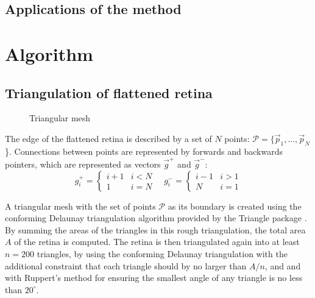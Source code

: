 \documentclass{article}
\begin{document}
\subsection{Applications of the method}
\label{fold-sphere:sec:applications-method}


\section{Algorithm}
\label{fold-retina:sec:method}



\subsection{Triangulation of flattened retina}
\label{fold-sphere:sec:triang-flatt-retina}

\begin{figure}[tp]
  \centering
  \caption{Triangular mesh}
  \label{fold-sphere:fig:mesh}
\end{figure}

The edge of the flattened retina is described by a set of $N$ points:
$\mathcal{P} = \{\vec{p}_1,\dots,\vec{p}_N$\}. Connections between
points are represented by forwards and backwards pointers, which are
represented as vectors $\vec{g}^+$ and $\vec{g}^-$:
\begin{displaymath}
  g^+_i = \left\{
    \begin{array}{ll}
      i+1 & i < N \\
      1   & i = N
    \end{array}\right.
  \quad
  g^-_i = \left\{
    \begin{array}{ll}
      i-1 & i > 1 \\
      N   & i = 1
    \end{array}\right.
\end{displaymath}

A triangular mesh with the set of points $\mathcal{P}$ as its boundary
is created using the conforming Delaunay triangulation algorithm
provided by the Triangle package \citep{shewchuk96b}. By summing the
areas of the triangles in this rough triangulation, the total area $A$
of the retina is computed. The retina is then triangulated again into
at least $n=200$ triangles, by using the conforming Delaunay
triangulation with the additional constraint that each triangle should
by no larger than $A/n$, and and with Ruppert's
 method for ensuring the smallest angle of
any triangle is no less than $20^\circ$.
\end{document}
